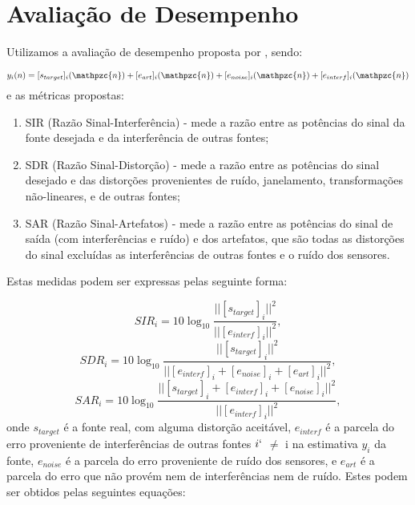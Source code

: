 \section{Avaliação de Desempenho}
    Utilizamos a avaliação de desempenho proposta por \cite{performance}, sendo:
    
    \begin{equation}
         y_i(n) = [s_{target}]_i(\mathpzc{n})  + [e_{art}]_i(\mathpzc{n})  +  [e_{noise}]_i(\mathpzc{n}) +  [e_{interf}]_i(\mathpzc{n})
    \end{equation}
    e as métricas propostas:
    
    \begin{enumerate}
        \item SIR (Razão Sinal-Interferência) - mede a razão entre as potências do sinal da fonte desejada e da interferência de outras fontes;
        \item SDR (Razão Sinal-Distorção) - mede a razão entre as potências do sinal desejado e das distorções provenientes de ruído, janelamento, transformações não-lineares, e de outras fontes;
        \item SAR (Razão Sinal-Artefatos) - mede a razão entre as potências do sinal de saída (com interferências e ruído) e dos artefatos, que são todas as distorções do sinal excluídas as interferências de outras fontes e o ruído dos sensores.
    \end{enumerate}
    
    Estas medidas podem ser expressas pelas seguinte forma:
    
    \begin{equation}
        \label{eq:sir}
        SIR_i = 10\log_{10} \frac{|| [s_{target}]_i ||^2}{|| [e_{interf}]_i ||^2},
    \end{equation}
    \medskip
    \begin{equation}
        \label{eq:sdr}
        SDR_i = 10\log_{10} \frac{|| [s_{target}]_i ||^2}{|| [e_{interf}]_i + [e_{noise}]_i + [e_{art}]_i   ||^2},
    \end{equation}
    \medskip
    \begin{equation}
        \label{eq:sar}
        SAR_i = 10\log_{10} \frac{|| [s_{target}]_i + [e_{interf}]_i + [e_{noise}]_i ||^2}{|| [e_{interf}]_i ||^2},
    \end{equation}
    onde $s_{target}$ é a fonte real, com alguma distorção aceitável, $e_{interf}$  é a parcela do erro
proveniente de interferências de outras fontes $i`$ $\neq$ i na estimativa $y_i$ da fonte, $e_{noise}$
é a parcela do erro proveniente de ruído dos sensores, e $e_{art}$ é a parcela do erro que não provém nem de interferências nem de ruído. Estes podem ser obtidos pelas seguintes equações:


